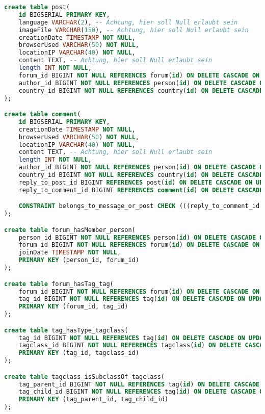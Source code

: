 \begin{lstlisting}[language=sql]
create table post(
    id BIGSERIAL PRIMARY KEY,
    language VARCHAR(2), -- Achtung, hier soll Null erlaubt sein
    imageFile VARCHAR(150), -- Achtung, hier soll Null erlaubt sein
    creationDate TIMESTAMP NOT NULL,
    browserUsed VARCHAR(50) NOT NULL,
    locationIP VARCHAR(40) NOT NULL,
    content TEXT, -- Achtung, hier soll Null erlaubt sein
    length INT NOT NULL,
    forum_id BIGINT NOT NULL REFERENCES forum(id) ON DELETE CASCADE ON UPDATE CASCADE,
    author_id BIGINT NOT NULL REFERENCES person(id) ON DELETE CASCADE ON UPDATE CASCADE,
    country_id BIGINT NOT NULL REFERENCES country(id) ON DELETE CASCADE ON UPDATE CASCADE
);

create table comment(
    id BIGSERIAL PRIMARY KEY,
    creationDate TIMESTAMP NOT NULL,
    browserUsed VARCHAR(50) NOT NULL,
    locationIP VARCHAR(40) NOT NULL,
    content TEXT, -- Achtung, hier soll Null erlaubt sein
    length INT NOT NULL,
    author_id BIGINT NOT NULL REFERENCES person(id) ON DELETE CASCADE ON UPDATE CASCADE,
    country_id BIGINT NOT NULL REFERENCES country(id) ON DELETE CASCADE ON UPDATE CASCADE,
    reply_to_post_id BIGINT REFERENCES post(id) ON DELETE CASCADE ON UPDATE CASCADE,
    reply_to_comment_id BIGINT REFERENCES comment(id) ON DELETE CASCADE ON UPDATE CASCADE,

    CONSTRAINT belongs_to_message_or_post CHECK (((reply_to_comment_id IS NOT NULL) AND (reply_to_post_id IS NULL)) OR ((reply_to_comment_id IS NULL) AND (reply_to_post_id IS NOT NULL))) -- noch schauen ob das so geht, besser XOR!
);

create table forum_hasMember_person(
    person_id BIGINT NOT NULL REFERENCES person(id) ON DELETE CASCADE ON UPDATE CASCADE,
    forum_id BIGINT NOT NULL REFERENCES forum(id) ON DELETE CASCADE ON UPDATE CASCADE,
    joinDate TIMESTAMP NOT NULL,
    PRIMARY KEY (person_id, forum_id)
);

create table forum_hasTag_tag(
    forum_id BIGINT NOT NULL REFERENCES forum(id) ON DELETE CASCADE ON UPDATE CASCADE,
    tag_id BIGINT NOT NULL REFERENCES tag(id) ON DELETE CASCADE ON UPDATE CASCADE,
    PRIMARY KEY (forum_id, tag_id)
);

create table tag_hasType_tagclass(
    tag_id BIGINT NOT NULL REFERENCES tag(id) ON DELETE CASCADE ON UPDATE CASCADE,
    tagclass_id BIGINT NOT NULL REFERENCES tagclass(id) ON DELETE CASCADE ON UPDATE CASCADE,
    PRIMARY KEY (tag_id, tagclass_id)
);

create table tagclass_isSubclassOf_tagclass(
    tag_parent_id BIGINT NOT NULL REFERENCES tag(id) ON DELETE CASCADE ON UPDATE CASCADE,
    tag_child_id BIGINT NOT NULL REFERENCES tag(id) ON DELETE CASCADE ON UPDATE CASCADE,
    PRIMARY KEY (tag_parent_id, tag_child_id)
);


\end{lstlisting}
